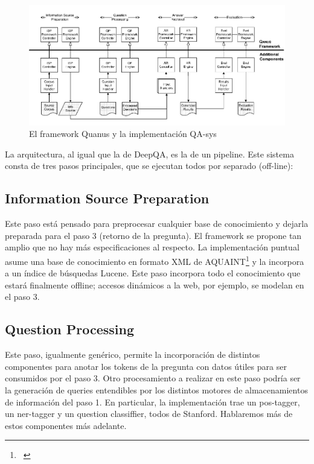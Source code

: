 \begin{figure}
  \centering
    \includegraphics{graficos/Quanus}
  \caption{El framework Quanus y la implementación QA-sys}
  \label{fig:Quanus}
\end{figure}


La arquitectura, al igual que la de DeepQA, es la de un pipeline. Este
sistema consta de tres pasos principales, que se ejecutan todos por
separado (off-line): 


\bigskip

\subsection{Information Source Preparation}
Este paso est\'a pensado para preprocesar cualquier base de conocimiento
y dejarla preparada para el paso 3 (retorno de la pregunta). El
framework se propone tan amplio que no hay m\'as especificaciones al
respecto. La implementaci\'on puntual asume una base de conocimiento en
formato XML de AQUAINT\footnote{\ } y la incorpora a un \'indice de
b\'usquedas Lucene. Este paso incorpora todo el conocimiento que
estar\'a finalmente offline; accesos din\'amicos a la web, por ejemplo,
se modelan en el paso 3.


\bigskip

\subsection{Question Processing}
Este paso, igualmente gen\'erico, permite la incorporaci\'on de
distintos componentes para anotar los tokens de la pregunta con datos
\'utiles para ser consumidos por el paso 3. Otro procesamiento a
realizar en este paso podr\'ia ser la generaci\'on de queries
entendibles por los distintos motores de almacenamientos de
informaci\'on del paso 1. En particular, la implementaci\'on trae un
pos-tagger, un ner-tagger y un question classiffier, todos de Stanford.
Hablaremos m\'as de estos componentes m\'as adelante. 


